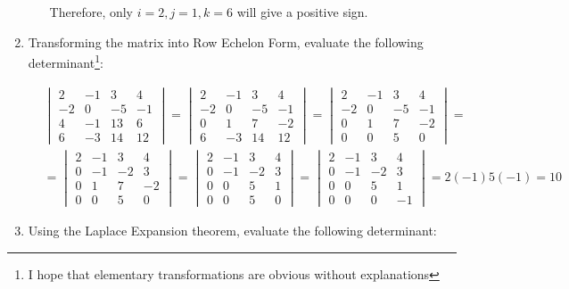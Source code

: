 \documentclass{article}
\begin{document}
\begin{enumerate}
\begin{enumerate}
Therefore, only $i=2, j=1, k=6$ will give a positive sign.
\end{enumerate}

\newpage
\item Transforming the matrix into Row Echelon Form, evaluate the following determinant\footnote{I hope that elementary transformations are obvious without explanations}:

\begin{align*}
&\begin{vmatrix}
2&-1&3&4\\
-2&0&-5&-1\\
4&-1&13&6\\
6&-3&14&12
\end{vmatrix}=
\begin{vmatrix}
2&-1&3&4\\
-2&0&-5&-1\\
0&1&7&-2\\
6&-3&14&12
\end{vmatrix}=
\begin{vmatrix}
2&-1&3&4\\
-2&0&-5&-1\\
0&1&7&-2\\
0&0&5&0
\end{vmatrix}=\\
&=\begin{vmatrix}
2&-1&3&4\\
0&-1&-2&3\\
0&1&7&-2\\
0&0&5&0
\end{vmatrix}=
\begin{vmatrix}
2&-1&3&4\\
0&-1&-2&3\\
0&0&5&1\\
0&0&5&0
\end{vmatrix}=
\begin{vmatrix}
2&-1&3&4\\
0&-1&-2&3\\
0&0&5&1\\
0&0&0&-1
\end{vmatrix}=2(-1)5(-1)=10
\end{align*}

\item Using the Laplace Expansion theorem, evaluate the following determinant:


\end{enumerate}
\end{document}
